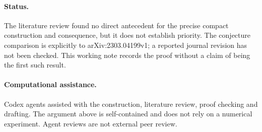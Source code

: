 \documentclass[11pt]{article}
\begin{document}
\paragraph{Status.}
The literature review found no direct antecedent for the precise compact
construction and consequence, but it does not establish priority. The
conjecture comparison is explicitly to arXiv:2303.04199v1; a reported journal
revision has not been checked. This working note records the proof without
a claim of being the first such result.

\paragraph{Computational assistance.}
Codex agents assisted with the construction, literature review, proof checking
and drafting. The argument above is self-contained and does not rely on a
numerical experiment. Agent reviews are not external peer review.
\end{document}
